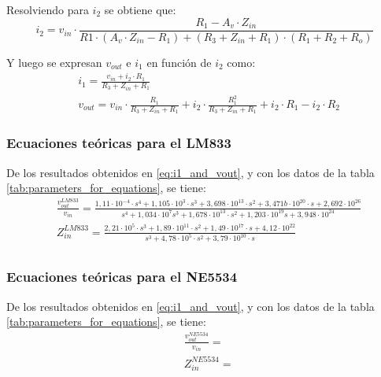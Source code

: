 Resolviendo para $i_2$ se obtiene que:
\begin{equation}
    i_2 = v_{in} \cdot \frac{R_1 - A_v \cdot Z_{in}}{R1 \cdot \left(A_v \cdot Z_{in} - R_1\right) + \left(R_3 + Z_{in} + R_1\right) \cdot \left(R_1 + R_2 + R_o\right)}
    \label{eq:i2}
\end{equation}

Y luego se expresan $v_{out}$ e $i_1$ en función de $i_2$ como:
\begin{align}
    \label{eq:i1_and_vout}
    &i_1 = \frac{v_{in} + i_2 \cdot R_1}{R_3 + Z_{in} + R_1} \\
    &v_{out} = v_{in} \cdot \frac{R_1}{R_3 + Z_{in} + R_1} + i_2 \cdot \frac{R_1^2}{R_3 + Z_{in} + R_1} + i_2 \cdot R_1 - i_2 \cdot R_2
\end{align}

\subsubsection{Ecuaciones teóricas para el LM833}
De los resultados obtenidos en \ref{eq:i1_and_vout}, y con los datos de la tabla \ref{tab:parameters_for_equations}, se tiene:
\begin{align}
    & \frac{v_{out}^{LM833}}{v_{in}} = \frac{1,11 \cdot 10^{-4} \cdot s^{4} + 1,105 \cdot 10^{3} \cdot s^{3} + 3,698 \cdot 10^{13} \cdot s^{2} + 3,471b\cdot 10^{20} \cdot s + 2,692 \cdot 10^{26}}
    {s^{4} + 1,034 \cdot 10^{7} s^{3} + 1,678 \cdot 10^{13} \cdot s^{2} + 1,203 \cdot 10^{19} s + 3,948 \cdot 10^{24}} \label{eq:LM833_transfer_fun} \\
    & Z_{in}^{LM833} = \frac{2,21 \cdot 10^{5} \cdot s^3 + 1,89 \cdot 10^{11} \cdot s^2 + 1,49 \cdot 10^{17} \cdot s + 4,12 \cdot 10^{22}}
    {s^3 + 4,78 \cdot 10^{5} \cdot s^2 + 3,79 \cdot 10^{10} \cdot s} \label{eq:LM833_in_impedance} \\
\end{align}

\subsubsection{Ecuaciones teóricas para el NE5534}
De los resultados obtenidos en \ref{eq:i1_and_vout}, y con los datos de la tabla \ref{tab:parameters_for_equations}, se tiene:
\begin{align}
    & \frac{v_{out}^{NE5534}}{v_{in}} = \label{eq:NE5534_transfer_fun} \\
    & Z_{in}^{NE5534} = \label{eq:NE5534_in_impedance}
\end{align}


